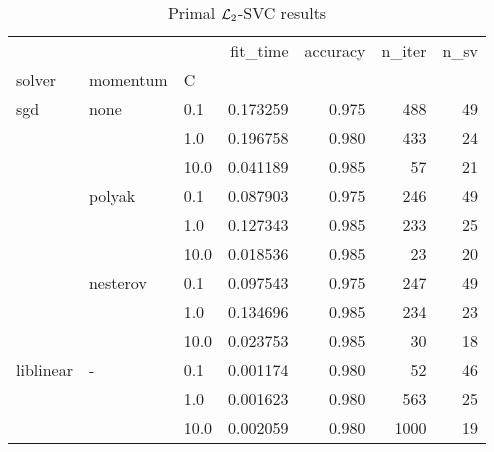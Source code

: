 \begin{table}[H]
\centering
\caption{Primal $\protect \mathcal{L}_2$-SVC results}
\label{primal_l2_svc_cv_results}
\begin{tabular}{lllrrrr}
\toprule
          &   &      &  fit\_time &  accuracy &  n\_iter &  n\_sv \\
solver & momentum & C &           &           &         &       \\
\midrule
sgd & none & 0.1  &  0.173259 &     0.975 &     488 &    49 \\
          &   & 1.0  &  0.196758 &     0.980 &     433 &    24 \\
          &   & 10.0 &  0.041189 &     0.985 &      57 &    21 \\
          & polyak & 0.1  &  0.087903 &     0.975 &     246 &    49 \\
          &   & 1.0  &  0.127343 &     0.985 &     233 &    25 \\
          &   & 10.0 &  0.018536 &     0.985 &      23 &    20 \\
          & nesterov & 0.1  &  0.097543 &     0.975 &     247 &    49 \\
          &   & 1.0  &  0.134696 &     0.985 &     234 &    23 \\
          &   & 10.0 &  0.023753 &     0.985 &      30 &    18 \\
liblinear & - & 0.1  &  0.001174 &     0.980 &      52 &    46 \\
          &   & 1.0  &  0.001623 &     0.980 &     563 &    25 \\
          &   & 10.0 &  0.002059 &     0.980 &    1000 &    19 \\
\bottomrule
\end{tabular}
\end{table}
